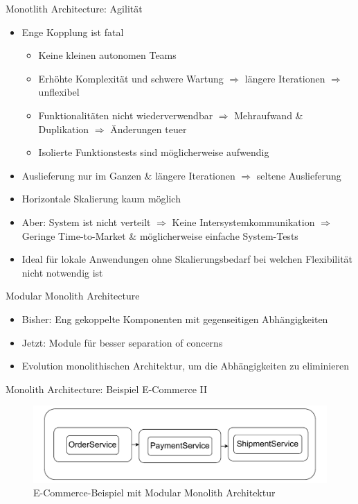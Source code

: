 \begin{frame}{Monotlith Architecture: Agilität}
    \begin{itemize}
        \item Enge Kopplung ist fatal
        \begin{itemize}
            \item Keine kleinen autonomen Teams
            \item Erhöhte Komplexität und schwere Wartung $\Rightarrow$ längere Iterationen $\Rightarrow$ unflexibel
            \item Funktionalitäten nicht wiederverwendbar $\Rightarrow$ Mehraufwand \& Duplikation $\Rightarrow$ Änderungen teuer
            \item Isolierte Funktionstests sind möglicherweise aufwendig
        \end{itemize}
        \item Auslieferung nur im Ganzen \& längere Iterationen $\Rightarrow$ seltene Auslieferung
        \item Horizontale Skalierung kaum möglich
        \item Aber: System ist nicht verteilt $\Rightarrow$ Keine Intersystemkommunikation $\Rightarrow$ Geringe Time-to-Market \& möglicherweise einfache System-Tests
        \item Ideal für lokale Anwendungen ohne Skalierungsbedarf bei welchen Flexibilität nicht notwendig ist
    \end{itemize}
\end{frame}


\begin{frame}{Modular Monolith Architecture}
    \begin{itemize}
       \item Bisher: Eng gekoppelte Komponenten mit gegenseitigen Abhängigkeiten
       \item Jetzt: Module für besser separation of concerns
       \item Evolution monolithischen Architektur, um die Abhängigkeiten zu eliminieren
     \end{itemize}
\end{frame}

\begin{frame}{Monolith Architecture: Beispiel E-Commerce II}
    \begin{figure}[!h]
        \centering
        \includegraphics[scale=0.70]{imglib/mono/mono-example}
        \caption{E-Commerce-Beispiel mit Modular Monolith Architektur}
        \label{fig:mono-modular}
    \end{figure}
\end{frame}

